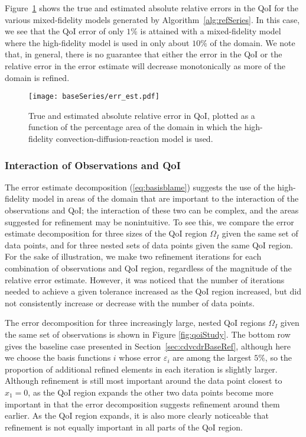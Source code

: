 Figure~\ref{fig:baseErr} shows the true and estimated absolute relative errors in the QoI for the various mixed-fidelity models generated by Algorithm~\ref{alg:refSeries}. In this case, we see that the QoI error of only $1\%$ is attained with a mixed-fidelity model where the high-fidelity model is used in only about $10\%$ of the domain. We note that, in general, there is no guarantee that either the error in the QoI or the relative error in the error estimate will decrease monotonically as more of the domain is refined.
%
\begin{figure}[h]
\centering
\texttt{[image: baseSeries/err\_est.pdf]}
\caption{True and estimated absolute relative error in QoI, plotted as a function of the percentage area of the domain in which the high-fidelity convection-diffusion-reaction model is used.}
\label{fig:baseErr}
\end{figure}
%

\subsubsection{Interaction of Observations and QoI} \label{sec:qoivdata}
%
The error estimate decomposition (\ref{eq:basisblame}) suggests the use of the high-fidelity model in areas of the domain that are important to the interaction of the observations and QoI; the interaction of these two can be complex, and the areas suggested for refinement may be nonintuitive. To see this, we compare the error estimate decomposition for three sizes of the QoI region $\Omega_I$ given the same set of data points, and for three nested sets of data points given the same QoI region. For the sake of illustration, we make two refinement iterations for each combination of observations and QoI region, regardless of the magnitude of the relative error estimate. However, it was noticed that the number of iterations needed to achieve a given tolerance increased as the QoI region increased, but did not consistently increase or decrease with the number of data points.

The error decomposition for three increasingly large, nested QoI regions $\Omega_I$ given the same set of observations is shown in Figure \ref{fig:qoiStudy}. The bottom row gives the baseline case presented in Section~\ref{sec:cdvcdrBaseRef}, although here we choose the basis functions $i$ whose error $\varepsilon_i$ are among the largest $5\%$, so the proportion of additional refined elements in each iteration is slightly larger. Although refinement is still most important around the data point closest to $x_1=0$, as the QoI region expands the other two data points become more important in that the error decomposition suggests refinement around them earlier. As the QoI region expands, it is also more clearly noticeable that refinement is not equally important in all parts of the QoI region.

